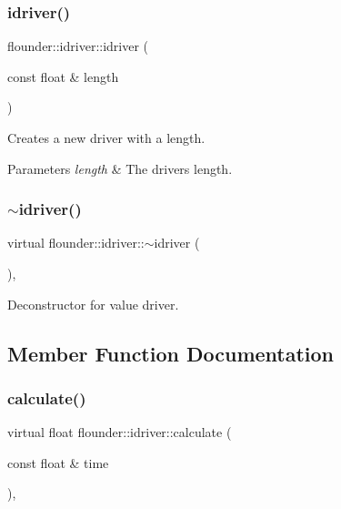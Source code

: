 \subsubsection{\texorpdfstring{idriver()}{idriver()}}
{\footnotesize\ttfamily flounder\+::idriver\+::idriver (\begin{DoxyParamCaption}\item[{const float \&}]{length }\end{DoxyParamCaption})\hspace{0.3cm}{\ttfamily [inline]}}



Creates a new driver with a length. 


\begin{DoxyParams}{Parameters}
{\em length} & The drivers length. \\
\hline
\end{DoxyParams}
\mbox{\label{classflounder_1_1idriver_a2a0111059b64474e6650b58d215defe0}} 
\subsubsection{\texorpdfstring{$\sim$idriver()}{~idriver()}}
{\footnotesize\ttfamily virtual flounder\+::idriver\+::$\sim$idriver (\begin{DoxyParamCaption}{ }\end{DoxyParamCaption})\hspace{0.3cm}{\ttfamily [inline]}, {\ttfamily [virtual]}}



Deconstructor for value driver. 



\subsection{Member Function Documentation}
\mbox{\label{classflounder_1_1idriver_a034c4159dc98c4c37ffdfaae64e4a16d}} 
\subsubsection{\texorpdfstring{calculate()}{calculate()}}
{\footnotesize\ttfamily virtual float flounder\+::idriver\+::calculate (\begin{DoxyParamCaption}\item[{const float \&}]{time }\end{DoxyParamCaption})\hspace{0.3cm}{\ttfamily [protected]}, {}}



